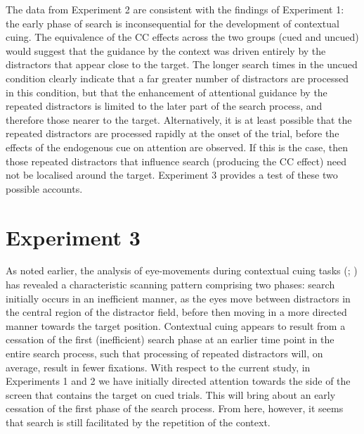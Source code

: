 \documentclass[
  man,
  floatsintext,
  longtable,
  nolmodern,
  notxfonts,
  notimes,
  colorlinks=true,linkcolor=blue,citecolor=blue,urlcolor=blue]{apa7}
\begin{document}
The data from Experiment 2 are consistent with the findings of
Experiment 1: the early phase of search is inconsequential for the
development of contextual cuing. The equivalence of the CC effects
across the two groups (cued and uncued) would suggest that the guidance
by the context was driven entirely by the distractors that appear close
to the target. The longer search times in the uncued condition clearly
indicate that a far greater number of distractors are processed in this
condition, but that the enhancement of attentional guidance by the
repeated distractors is limited to the later part of the search process,
and therefore those nearer to the target. Alternatively, it is at least
possible that the repeated distractors are processed rapidly at the
onset of the trial, before the effects of the endogenous cue on
attention are observed. If this is the case, then those repeated
distractors that influence search (producing the CC effect) need not be
localised around the target. Experiment 3 provides a test of these two
possible accounts.

\section{Experiment 3}\label{experiment-3}

As noted earlier, the analysis of eye-movements during contextual cuing
tasks (;
) has revealed a
characteristic scanning pattern comprising two phases: search initially
occurs in an inefficient manner, as the eyes move between distractors in
the central region of the distractor field, before then moving in a more
directed manner towards the target position. Contextual cuing appears to
result from a cessation of the first (inefficient) search phase at an
earlier time point in the entire search process, such that processing of
repeated distractors will, on average, result in fewer fixations. With
respect to the current study, in Experiments 1 and 2 we have initially
directed attention towards the side of the screen that contains the
target on cued trials. This will bring about an early cessation of the
first phase of the search process. From here, however, it seems that
search is still facilitated by the repetition of the context.
\end{document}
